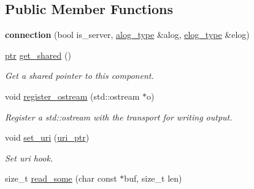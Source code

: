 \subsection*{Public Member Functions}
\begin{DoxyCompactItemize}
\item 
\mbox{\label{classwebsocketpp_1_1transport_1_1iostream_1_1connection_a737fcfe26dfda316d9908b819d3580b0}} 
{\bfseries connection} (bool is\+\_\+server, \mbox{\hyperlink{classwebsocketpp_1_1transport_1_1iostream_1_1connection_a0bd2807136340e5af69325f3163fb79b}{alog\+\_\+type}} \&alog, \mbox{\hyperlink{classwebsocketpp_1_1transport_1_1iostream_1_1connection_a3d5acbd564bf27265665f243b80fc251}{elog\+\_\+type}} \&elog)
\item 
\mbox{\label{classwebsocketpp_1_1transport_1_1iostream_1_1connection_afab9454b5af00a8edb494fdd2e32a41e}} 
\mbox{\hyperlink{classwebsocketpp_1_1transport_1_1iostream_1_1connection_a054436e87f6dc4404b13f6131707d2ab}{ptr}} \mbox{\hyperlink{classwebsocketpp_1_1transport_1_1iostream_1_1connection_afab9454b5af00a8edb494fdd2e32a41e}{get\+\_\+shared}} ()
\begin{DoxyCompactList}\small\item\em Get a shared pointer to this component. \end{DoxyCompactList}\item 
void \mbox{\hyperlink{classwebsocketpp_1_1transport_1_1iostream_1_1connection_ad0d1f64845818bb6bebe43fe057e4da2}{register\+\_\+ostream}} (std\+::ostream $\ast$o)
\begin{DoxyCompactList}\small\item\em Register a std\+::ostream with the transport for writing output. \end{DoxyCompactList}\item 
void \mbox{\hyperlink{classwebsocketpp_1_1transport_1_1iostream_1_1connection_a0f5d21e86961b0f3d75c417d5f45d4ac}{set\+\_\+uri}} (\mbox{\hyperlink{namespacewebsocketpp_aae370ea5ac83a8ece7712cb39fc23f5b}{uri\+\_\+ptr}})
\begin{DoxyCompactList}\small\item\em Set uri hook. \end{DoxyCompactList}\item 
size\+\_\+t \mbox{\hyperlink{classwebsocketpp_1_1transport_1_1iostream_1_1connection_a4616555cbee050aec84da1e39a3c34a8}{read\+\_\+some}} (char const $\ast$buf, size\+\_\+t len)

\end{DoxyCompactItemize}
